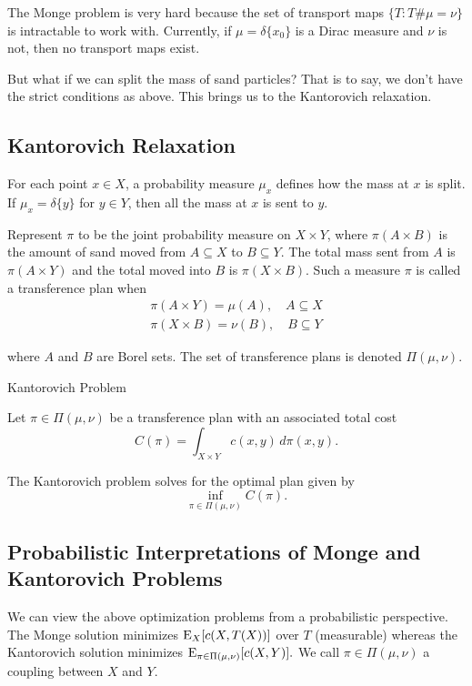 The Monge problem is very hard because the set of transport maps $\{T:T\#\mu = \nu\}$ is intractable to work with. Currently, if $\mu=\delta\{x_0\}$ is a Dirac measure and $\nu$ is not, then no transport maps exist.

But what if we can split the mass of sand particles? That is to say, we don't have the strict conditions as above. This brings us to the Kantorovich relaxation.

\subsection*{Kantorovich Relaxation}
For each point $x\in X$, a probability measure $\mu_x$ defines how the mass at $x$ is split. If $\mu_x = \delta\{y\}$ for $y\in Y$, then all the mass at $x$ is sent to $y$.

Represent $\pi$ to be the joint probability measure on $X\times Y$, where $\pi(A\times B)$ is the amount of sand moved from $A\subseteq X$ to $B\subseteq Y$. The total mass sent from $A$ is $\pi(A\times Y)$ and the total moved into $B$ is $\pi(X\times B)$. Such a measure $\pi$ is called a  transference plan when
\begin{align*}
\pi(A\times Y) = \mu(A),\quad A\subseteq X \\
\pi(X\times B) = \nu(B),\quad B\subseteq Y
\end{align*}

where $A$ and $B$ are Borel sets. The set of transference plans is denoted $\Pi(\mu,\nu)$.

\begin{definition}{Kantorovich Problem}
	
	Let $\pi\in \Pi(\mu,\nu)$ be a transference plan with an associated total cost \[
	C(\pi) = \int_{X\times Y} c(x,y) \,d\pi(x,y).
	\]
	
	The Kantorovich problem solves for the optimal plan given by
	\[
	\inf_{\pi\in \Pi(\mu,\nu)} C(\pi).
	\]
\end{definition}

\subsection*{Probabilistic Interpretations of Monge and Kantorovich Problems}
We can view the above optimization problems from a probabilistic perspective. The Monge solution minimizes  $\mathrm{E}_{X}[c(X,T(X))]$ over $T$ (measurable) whereas the Kantorovich solution minimizes $\displaystyle\mathrm{E}_{\pi\in \Pi(\mu,\nu)}[c(X,Y)].$ We call $\pi \in \Pi(\mu,\nu)$ a coupling between $X$ and $Y$.

